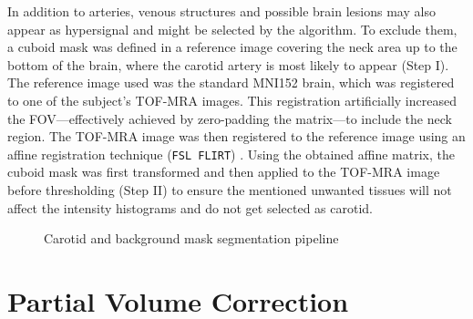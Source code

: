 In addition to arteries, venous structures and possible brain lesions may also appear as hypersignal and might be selected by the algorithm.
To exclude them, a cuboid mask was defined in a reference image covering the neck area up to the bottom of the brain, where the carotid artery is most likely to appear (Step I).
The reference image used was the standard MNI152 brain, which was registered to one of the subject's TOF-MRA images.
This registration artificially increased the FOV---effectively achieved by zero-padding the matrix---to include the neck region.
The TOF-MRA image was then registered to the reference image using an affine registration technique (\texttt{\small FSL FLIRT}) \cite{jenkinson2012fsl}.
Using the obtained affine matrix, the cuboid mask was first transformed and then applied to the TOF-MRA image before thresholding (Step II) to ensure the mentioned unwanted tissues will not affect the intensity histograms and do not get selected as carotid.



\begin{figure}[h]
	\centering
	\caption{Carotid and background mask segmentation pipeline}
	\label{fig:seg_pipeline}
\end{figure}

\section{Partial Volume Correction}
